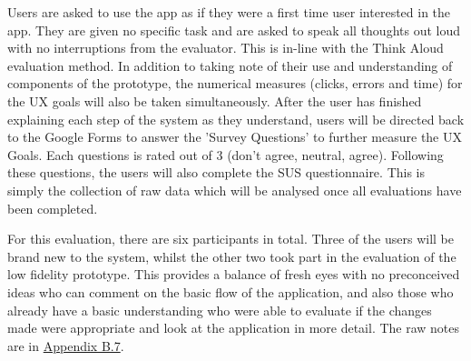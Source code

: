 \documentclass[a4 paper, 12pt]{article}
\begin{document}
    Users are asked to use the app as if they were a first time user interested in the app. They are given no specific task and are asked to speak all thoughts out loud with no interruptions from the evaluator. This is in-line with the Think Aloud evaluation method. In addition to taking note of their use and understanding of components of the prototype, the numerical measures (clicks, errors and time) for the UX goals will also be taken simultaneously. After the user has finished explaining each step of the system as they understand, users will be directed back to the Google Forms to answer the 'Survey Questions' to further measure the UX Goals. Each questions is rated out of 3 (don't agree, neutral, agree). Following these questions, the users will also complete the SUS questionnaire. This is simply the collection of raw data which will be analysed once all evaluations have been completed.
  
    For this evaluation, there are six participants in total. Three of the users will be brand new to the system, whilst the other two took part in the evaluation of the low fidelity prototype. This provides a balance of fresh eyes with no preconceived ideas who can comment on the basic flow of the application, and also those who already have a basic understanding who were able to evaluate if the changes made were appropriate and look at the application in more detail. The raw notes are in \hyperref[sec:B.7]{Appendix B.7}. 
\end{document}

